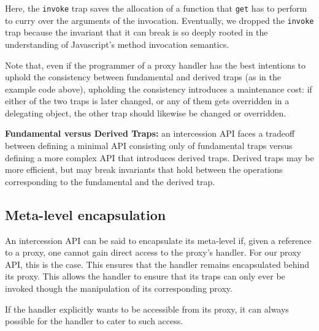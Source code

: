 \documentclass{acm_proc_article-sp}
\begin{document}
Here, the \texttt{invoke} trap saves the allocation of a function that \texttt{get} has to perform to curry over the arguments of the invocation. Eventually, we dropped the \texttt{invoke} trap because the invariant that it can break is so deeply rooted in the understanding of Javascript's method invocation semantics.

Note that, even if the programmer of a proxy handler has the best intentions to uphold the consistency between fundamental and derived traps (as in the example code above), upholding the consistency introduces a maintenance cost: if either of the two traps is later changed, or any of them gets overridden in a delegating object, the other trap should likewise be changed or overridden.

\textbf{Fundamental versus Derived Traps:} an intercession API faces a tradeoff between defining a minimal API consisting only of fundamental traps versus defining a more complex API that introduces derived traps. Derived traps may be more efficient, but may break invariants that hold between the operations corresponding to the fundamental and the derived trap.

\subsection{Meta-level encapsulation}
\label{sub:meta_level_encapsulation}

An intercession API can be said to encapsulate its meta-level if, given a reference to a proxy, one cannot gain direct access to the proxy's handler. For our proxy API, this is the case. This ensures that the handler remains encapsulated behind its proxy. This allows the handler to ensure that its traps can only ever be invoked though the manipulation of its corresponding proxy.

If the handler explicitly wants to be accessible from its proxy, it can always possible for the handler to cater to such access.


\end{document}
